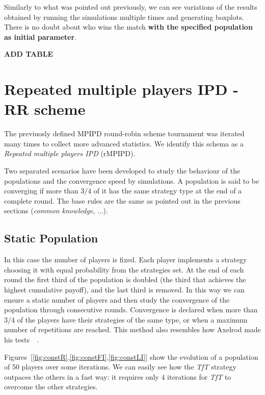 \documentclass[journal,a4paper,10pt,twoside]{IEEEtran} %
\begin{document}
Similarly to what was pointed out previously, we can see variations of the results obtained by running the simulations multiple times and generating boxplots. There is no doubt about who wins the match \textbf{with the specified population as initial parameter}.

\textbf{ADD TABLE}

\section{Repeated multiple players IPD - RR scheme} \label{s:rIPDMP}
The previuosly defined MPIPD round-robin scheme tournament was iterated many times to collect more advanced statistics.
We identify this schema as a \textit{Repeated multiple players IPD} (rMPIPD).

Two separated scenarios have been developed to study the behaviour of the populations and the convergence speed by simulations. A population is said to be converging if more than $3/4$ of it has the same strategy type at the end of a complete round. The base rules are the same as pointed out in the previous sections (\textit{common knowledge}, ...).

\subsection{Static Population}
In this case the number of players is fixed. Each player implements a strategy choosing it with equal probability from the strategies set. At the end of each round the first third of the population is doubled (the third that achieves the highest cumulative payoff), and the last third is removed. In this way we can ensure a static number of players and then study the convergence of the population through consecutive rounds.
Convergence is declared when more than $3/4$ of the players have their strategies of the same type, or when a maximum number of repetitions are reached.
This method also resembles how Axelrod made his tests~\cite[\S 2.6]{mathieu2017}~\cite{axelrod1984evolution}.

Figures~[\ref{fig:constR},\ref{fig:constFI},\ref{fig:constLI}] show the evolution of a population of 50 players over some iterations. We can easily see how the \textit{TfT} strategy outpaces the others in a fast way: it requires only $4$ iterations for \textit{TfT} to overcome the other strategies.
\end{document}
